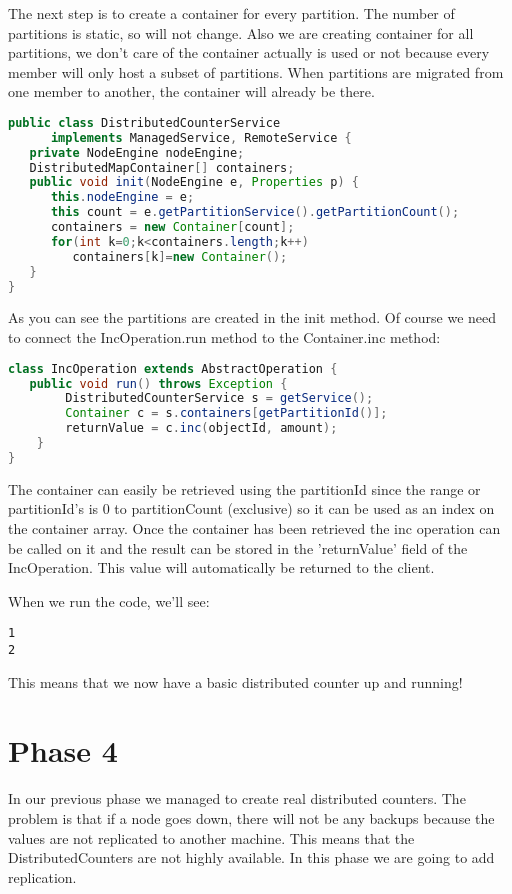 The next step is to create a container for every partition. The number of partitions is static, so will not change. Also we are creating container for all partitions, we don't care of the container actually is used or not because every member will only host a subset of partitions. When partitions are migrated from one member to another, the container will already be there.
\begin{lstlisting}[language=java]
public class DistributedCounterService 
      implements ManagedService, RemoteService {
   private NodeEngine nodeEngine;
   DistributedMapContainer[] containers;
   public void init(NodeEngine e, Properties p) {
      this.nodeEngine = e;
      this count = e.getPartitionService().getPartitionCount();
      containers = new Container[count];
      for(int k=0;k<containers.length;k++) 
         containers[k]=new Container();
   }
}
\end{lstlisting}
As you can see the partitions are created in the init method. Of course we need to connect the IncOperation.run method to the Container.inc method:
\begin{lstlisting}[language=java]
class IncOperation extends AbstractOperation {
   public void run() throws Exception {
        DistributedCounterService s = getService();
        Container c = s.containers[getPartitionId()];
        returnValue = c.inc(objectId, amount);
    }
}
\end{lstlisting}
The container can easily be retrieved using the partitionId since the range or partitionId's is 0 to partitionCount (exclusive) so it can be used as an index on the container array. Once the container has been retrieved the inc operation can be called on it and the result can be stored in the 'returnValue' field of the IncOperation. This value will automatically be returned to the client.

When we run the code, we'll see:
\begin{lstlisting}
1
2
\end{lstlisting}
This means that we now have a basic distributed counter up and running!

\section{Phase 4}
In our previous phase we managed to create real distributed counters. The problem is that if a node goes down, there will not be any backups because the values are not replicated to another machine. This means that the DistributedCounters are not highly available. In this phase we are going to add replication.


